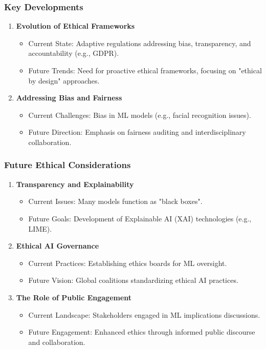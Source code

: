 \documentclass[aspectratio=169]{beamer}
\begin{document}
\begin{frame}[fragile]
    \frametitle{Key Developments}
    \begin{enumerate}
        \item \textbf{Evolution of Ethical Frameworks}
            \begin{itemize}
                \item Current State: Adaptive regulations addressing bias, transparency, and accountability (e.g., GDPR).
                \item Future Trends: Need for proactive ethical frameworks, focusing on "ethical by design" approaches.
            \end{itemize}

        \item \textbf{Addressing Bias and Fairness}
            \begin{itemize}
                \item Current Challenges: Bias in ML models (e.g., facial recognition issues).
                \item Future Direction: Emphasis on fairness auditing and interdisciplinary collaboration.
            \end{itemize}
    \end{enumerate}
\end{frame}

\begin{frame}[fragile]
    \frametitle{Future Ethical Considerations}
    \begin{enumerate}[resume]
        \item \textbf{Transparency and Explainability}
            \begin{itemize}
                \item Current Issues: Many models function as "black boxes".
                \item Future Goals: Development of Explainable AI (XAI) technologies (e.g., LIME).
            \end{itemize}

        \item \textbf{Ethical AI Governance}
            \begin{itemize}
                \item Current Practices: Establishing ethics boards for ML oversight.
                \item Future Vision: Global coalitions standardizing ethical AI practices.
            \end{itemize}

        \item \textbf{The Role of Public Engagement}
            \begin{itemize}
                \item Current Landscape: Stakeholders engaged in ML implications discussions.
                \item Future Engagement: Enhanced ethics through informed public discourse and collaboration.
            \end{itemize}
    \end{enumerate}
\end{frame}
\end{document}
